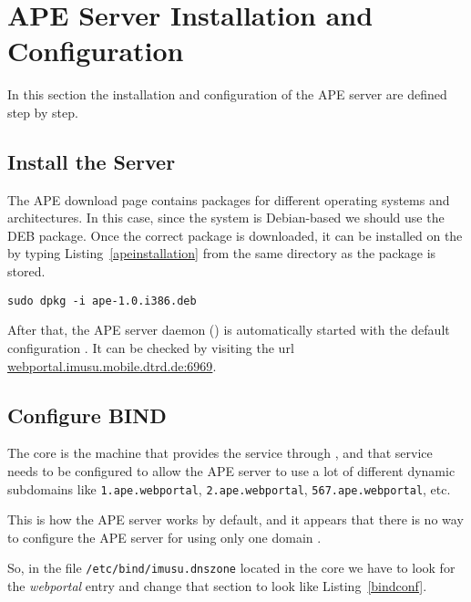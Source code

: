 \section{APE Server Installation and Configuration} %
\label{sec:apeconfig}

In this section the installation and configuration of the \ac{APE} server are defined step by step.

\subsection{Install the Server} %
\label{sub:apeinstall}

The \ac{APE} download page \cite{ApeDownload} contains packages for different operating systems and architectures.
In this case, since the system is Debian-based we should use the DEB package.
Once the correct package is downloaded, it can be installed on the  by typing Listing~\vref{apeinstallation} from the same directory as the package is stored.

\begin{lstlisting}[label=apeinstallation,caption=APE installation command]
sudo dpkg -i ape-1.0.i386.deb
\end{lstlisting}

After that, the \ac{APE} server daemon () is automatically started with the default configuration \cite{ApeSetup}.
It can be checked by visiting the url \url{webportal.imusu.mobile.dtrd.de:6969}.


\subsection{Configure BIND} %
\label{sub:bind}

The  core is the machine that provides the  service through , and that service needs to be configured to allow the \ac{APE} server to use a lot of different dynamic subdomains like \verb|1.ape.webportal|, \verb|2.ape.webportal|, \verb|567.ape.webportal|, etc.

This is how the \ac{APE} server works by default, and it appears that there is no way to configure the \ac{APE} server for using only one domain \cite{ApeConfig}.

So, in the file \verb|/etc/bind/imusu.dnszone| located in the  core
we have to look for the \emph{webportal} entry and change that section to look
like Listing~\vref{bindconf}.

